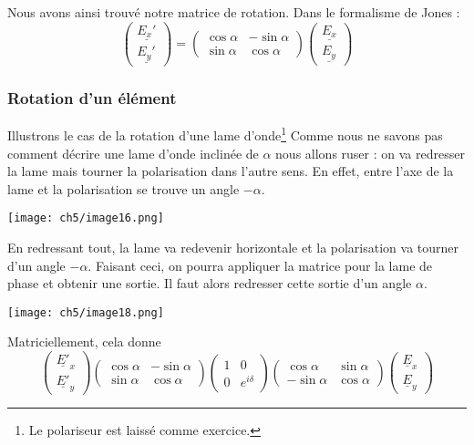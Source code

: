 	Nous avons ainsi trouvé notre matrice de rotation. Dans le formalisme de Jones :
	\begin{equation}
			\left(\begin{array}{c}
		\underline{E_x'}\\
		\underline{E_y'}
		\end{array}\right) = \left(\begin{array}{cc}
	\cos\alpha & -\sin\alpha\\
	\sin\alpha & \cos\alpha
	\end{array}\right)\left(\begin{array}{c}
		\underline{E_x}\\
		\underline{E_y}
		\end{array}\right)
	\end{equation}
	
		\subsubsection{Rotation d'un élément}
		Illustrons le cas de la rotation d'une lame d'onde\footnote{Le polariseur est laissé comme 
		exercice.} Comme nous ne savons pas comment décrire une lame d'onde inclinée de $\alpha$ nous 
		allons ruser : on va redresser la lame mais tourner la polarisation dans l'autre sens. En effet, 
		entre l'axe de la lame et la polarisation se trouve un angle $-\alpha$. 
\begin{center}
	\texttt{[image: ch5/image16.png]}
\end{center}		
		En redressant tout, 
		la lame va redevenir horizontale et la polarisation va tourner d'un angle $-\alpha$. Faisant 
		ceci, on pourra appliquer la matrice pour la lame de phase et obtenir une sortie. Il faut alors 
		redresser cette sortie d'un angle $\alpha$.
		\begin{center}
	\texttt{[image: ch5/image18.png]}
\end{center}	
		Matriciellement, cela donne
		\begin{equation}
		\left(\begin{array}{c}
		\underline{E'}_x\\
		\underline{E'}_y
		\end{array}\right)\left(\begin{array}{cc}
	\cos\alpha & -\sin\alpha\\
	\sin\alpha & \cos\alpha
	\end{array}\right)
	\left(\begin{array}{cc}
	1 & 0\\
	0 & e^{i\delta}
	\end{array}\right)\left(\begin{array}{cc}
	\cos\alpha & \sin\alpha\\
	-\sin\alpha & \cos\alpha
	\end{array}\right)		\left(\begin{array}{c}
		\underline{E}_x\\
		\underline{E}_y
		\end{array}\right)
		\end{equation}
